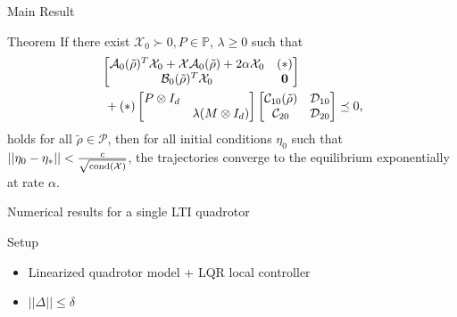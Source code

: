 \documentclass{beamer}
\begin{document}
\begin{frame}{Main Result}
	\begin{block}{Theorem}	
			If there exist $\mathcal{X}_0\succ 0,P \in \mathbb{P}$, $\lambda \geq 0$ such that 
			\begin{align}\label{eq:perf_LMI_noise_single}
				&\begin{bmatrix}
					\mathcal{A}_0(\tilde{\rho})^T\mathcal{X}_0+\mathcal{X}\mathcal{A}_0(\tilde{\rho})+2\alpha \mathcal{X}_0  & (*) \\
					\mathcal{B}_0(\tilde{\rho})^T\mathcal{X}_0    & \mathbf{0}
				\end{bmatrix} \nonumber \\
				&\hspace{0.1cm}+			
				(*)
				\begin{bmatrix}
					P \otimes I_d &\\&\lambda (M \otimes I_d)
				\end{bmatrix}
				\begin{bmatrix}
					\mathcal{C}_{10}(\tilde{\rho}) & \mathcal{D}_{10}\\
					\mathcal{C}_{20} &\mathcal{D}_{20}\\
				\end{bmatrix}
				\preceq 
				0,
			\end{align}
		holds for all $\tilde{\rho} \in \mathcal{P}$,
			then for all initial conditions $\eta_0$ such that $||\eta_0-\eta_*||< \frac{c}{\sqrt{\textnormal{cond}(\mathcal{X})}}$, the trajectories converge to the equilibrium exponentially at rate $\alpha$.
	\end{block}

\end{frame}
\begin{frame}{Numerical results for a single LTI quadrotor}
	\begin{figure}[ht]
		
	\end{figure}
	\begin{block}{Setup}
		\begin{itemize}
			\item Linearized quadrotor model + LQR local controller
			\item $||\Delta||\leq \delta$
		\end{itemize}
	\end{block}	
\end{frame}
\end{document}
